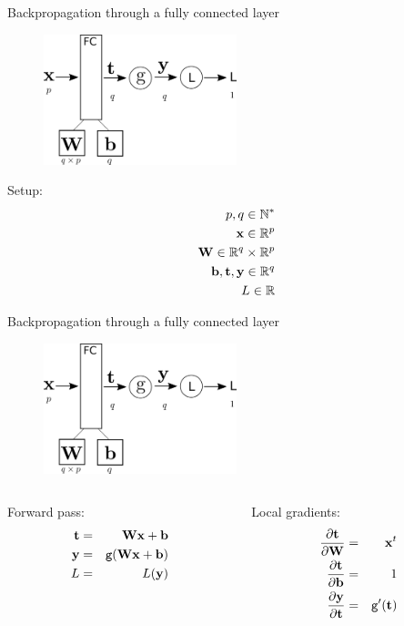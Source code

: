\documentclass[xcolor=pdftex,dvipsnames,table,mathserif]{beamer}
\begin{document}
\begin{frame}{Backpropagation through a fully connected layer}
  \begin{figure}
    \includegraphics[width=0.5\textwidth]{bp_fc.png}
  \end{figure}

  Setup:
  \begin{eqnarray*}
    p, q \in \mathbb{N}^*\\
    \mathbf{x} \in \mathbb{R}^p \\
    \mathbf{W} \in \mathbb{R}^q \times \mathbb{R}^p \\
    \mathbf{b}, \mathbf{t}, \mathbf{y} \in \mathbb{R}^q \\
    L \in \mathbb{R}
  \end{eqnarray*}

\end{frame}

\begin{frame}{Backpropagation through a fully connected layer}
  \begin{figure}
    \includegraphics[width=0.5\textwidth]{bp_fc.png}
  \end{figure}

  \begin{columns}
    \begin{column}{0.5\textwidth}
      Forward pass:
      \begin{eqnarray*}
        \mathbf{t} &=& \mathbf{W}\mathbf{x} + \mathbf{b} \\
        \mathbf{y} &=& \texttt{g}(\mathbf{W}\mathbf{x} + \mathbf{b}) \\
        L &=& L(\mathbf{y})
      \end{eqnarray*}
    \end{column}

    \begin{column}{0.5\textwidth}
      Local gradients:
      \begin{eqnarray*}
        \pdv{\mathbf{t}}{\mathbf{W}} &=& \mathbf{x}^t \\
        \pdv{\mathbf{t}}{\mathbf{b}} &=& 1 \\
        \pdv{\mathbf{y}}{\mathbf{t}} &=& \texttt{g}'(\mathbf{t})
      \end{eqnarray*}
    \end{column}
  \end{columns}

\end{frame}
\end{document}
